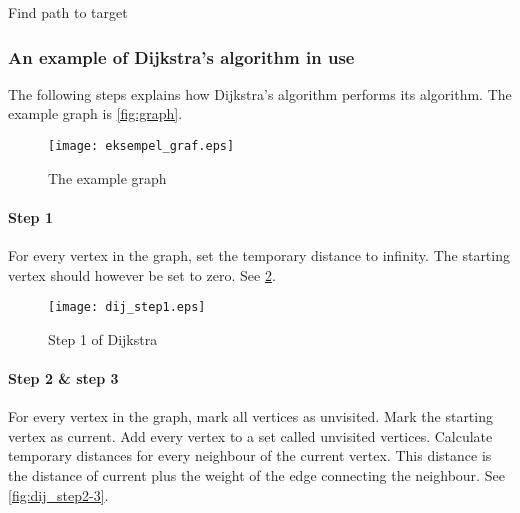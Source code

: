 \begin{algorithm}
  \caption{Find path to target}\label{algo:FindPath}


\end{algorithm}

\subsubsection{An example of Dijkstra's algorithm in use}\label{subss_dij_ex}

The following steps explains how Dijkstra's algorithm performs its algorithm. The example graph is \cref{fig:graph}.

  \begin{figure}[ht!]
    \centering
    \texttt{[image: eksempel\_graf.eps]}
    \caption{The example graph}
    \label{fig:dij_example_graph}
  \end{figure}

  \paragraph{Step 1}
For every vertex in the graph, set the temporary distance to infinity. The starting vertex should however be set to zero. See \cref{fig:dij_step1}.

  \begin{figure}[ht!]
    \centering
    \texttt{[image: dij\_step1.eps]}
    \caption{Step 1 of Dijkstra}
    \label{fig:dij_step1}
  \end{figure}

    \paragraph{Step 2 \& step 3}
For every vertex in the graph, mark all vertices as unvisited. Mark the starting vertex as current. Add every vertex to a set called unvisited vertices. Calculate temporary distances for every neighbour of the current vertex. This distance is the distance of current plus the weight of the edge connecting the neighbour. See \cref{fig:dij_step2-3}.

